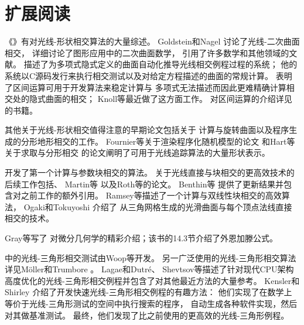 \section{扩展阅读}\label{sec:扩展阅读03}
《》有对光线-形状相交算法的大量综述\citep{10.5555/94788}。
Goldstein和Nagel \parencite*{doi:10.1177/003754977101600104}讨论了光线-二次曲面相交，
\citet{Heckbert84themathematics}详细讨论了图形应用中的二次曲面数学，
引用了许多数学和其他领域的文献。
\citet{10.1145/964967.801136}描述了为多项式隐式定义的曲面自动化推导光线相交例程过程的系统；
他的系统以C源码发行来执行相交测试以及对给定方程描述的曲面的常规计算。
\citet{10.5555/93267.93276}表明了区间运算可用于开发算法来稳定计算与
多项式无法描述而因此更难精确计算相交处的隐式曲面的相交；
Knoll等\parencite*{10.1111/j.1467-8659.2008.01189.x}最近做了这方面工作。
对区间运算的介绍详见\citet{moore1966interval}的书籍。

其他关于光线-形状相交值得注意的早期论文包括\citet{10.1145/800059.801137}关于
计算与旋转曲面以及程序生成的分形地形相交的工作。
Fournier等\parencite*{10.1145/358523.358553}关于渲染程序化随机模型的论文
和Hart等\parencite*{10.1145/74334.74363}关于求取与分形相交
的论文阐明了可用于光线追踪算法的大量形状表示。

\citet{10.1145/800064.801287}开发了第一个计算与参数块相交的算法。
关于光线直接与块相交的更高效技术的后续工作包括\citet{722295}、
Martin等\parencite*{doi:10.1080/10867651.2000.10487519}
以及Roth等\parencite*{https://doi.org/10.1111/1467-8659.00535}的论文。
Benthin等\parencite*{doi:10.1080/2151237X.2006.10129218}
提供了更新结果并包含对之前工作的额外引用。
Ramsey等\parencite*{doi:10.1080/10867651.2004.10504896}描述了一个计算与双线性块相交的高效算法，
Ogaki和Tokuyoshi \parencite*{10.1111/j.1467-8659.2011.01993.x}介绍了
从三角网格生成的光滑曲面与每个顶点法线直接相交的技术。

Gray等\parencite*{gray2017modern}写了
对微分几何学的精彩介绍；该书的14.3节介绍了外恩加滕公式。

中的光线-三角形相交测试由Woop等\parencite*{Woop2013Watertight}开发。
另一广泛使用的光线-三角形相交算法详见Möller和Trumbore \parencite*{doi:10.1080/10867651.1997.10487468}。
Lagae和Dutré\parencite*{doi:10.1080/2151237X.2005.10129208}、
Shevtsov等\parencite*{shevtsov2007ray}描述了针对现代CPU架构
高度优化的光线-三角形相交例程并包含了对其他最近方法的大量参考。
Kensler和Shirley \parencite*{4061543}介绍了开发快速光线-三角形相交例程的有趣方法：
他们实现了在数学上等价于光线-三角形测试的空间中执行搜索的程序，
自动生成各种软件实现，然后对其做基准测试。
最终，他们发现了比之前使用的更高效的光线-三角形例程。

